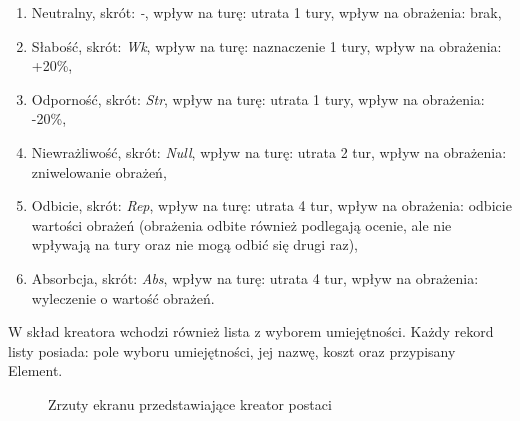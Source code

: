 \documentclass{SGGW-thesis}
\begin{document}
\begin{enumerate}
  \item{Neutralny, skrót: \textit{-}, wpływ na turę: utrata 1 tury, wpływ na obrażenia: brak},
  \item{Słabość, skrót: \textit{Wk}, wpływ na turę: naznaczenie 1 tury, wpływ na obrażenia: +20\%},
  \item{Odporność, skrót: \textit{Str}, wpływ na turę: utrata 1 tury, wpływ na obrażenia: -20\%},
  \item{Niewrażliwość, skrót: \textit{Null}, wpływ na turę: utrata 2 tur, wpływ na obrażenia: zniwelowanie obrażeń},
  \item{Odbicie, skrót: \textit{Rep}, wpływ na turę: utrata 4 tur, wpływ na obrażenia: odbicie wartości obrażeń (obrażenia odbite również podlegają ocenie, ale nie wpływają na tury oraz nie mogą odbić się drugi raz)},
  \item{Absorbcja, skrót: \textit{Abs}, wpływ na turę: utrata 4 tur, wpływ na obrażenia: wyleczenie o wartość obrażeń}.
\end{enumerate}
W skład kreatora wchodzi również lista z wyborem umiejętności. Każdy rekord listy posiada: pole wyboru umiejętności, jej nazwę, koszt oraz przypisany Element.
\pagebreak
\begin{figure}[H]
  \hfill
  \hfill
  \hfill
  \caption{Zrzuty ekranu przedstawiające kreator postaci}
\end{figure}
\pagebreak
\end{document}
